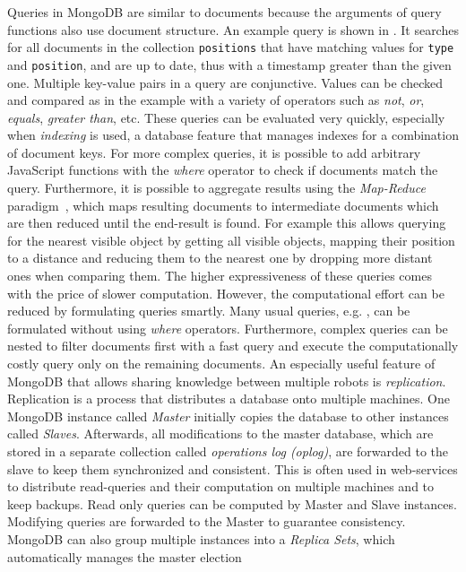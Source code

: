 Queries in MongoDB are similar to documents because the arguments of
query functions also use document structure. An example query is shown
in . It searches for all documents in the
collection \texttt{positions} that have matching values for
\texttt{type} and \texttt{position}, and are up to date, thus with a
timestamp greater than the given one. Multiple key-value pairs in a
query are conjunctive.  Values can be checked and compared as in the
example with a variety of operators such as \emph{not}, \emph{or},
\emph{equals}, \emph{greater than}, etc. These queries can be
evaluated very quickly, especially when \emph{indexing} is used, a
database feature that manages indexes for a combination of document
keys. For more complex queries, it is possible to add arbitrary
JavaScript functions with the \emph{where} operator to check if
documents match the query. Furthermore, it is possible to aggregate
results using the \emph{Map-Reduce} paradigm~\cite{mapreduce}, which
maps resulting documents to intermediate documents which are then
reduced until the end-result is found. For example this allows
querying for the nearest visible object by getting all visible
objects, mapping their position to a distance and reducing them to the
nearest one by dropping more distant ones when comparing them.  The
higher expressiveness of these queries comes with the price of slower
computation. However, the computational effort can be reduced by
formulating queries smartly. Many usual queries,
e.g. , can be formulated without using
\emph{where} operators. Furthermore, complex queries can be nested to
filter documents first with a fast query and execute the
computationally costly query only on the remaining documents.
%
An especially useful feature of MongoDB that allows sharing knowledge
between multiple robots is \emph{replication}. Replication is a
process that distributes a database onto multiple machines.  One
MongoDB instance called \emph{Master} initially copies the database to
other instances called \emph{Slaves}.  Afterwards, all modifications
to the master database, which are stored in a separate collection
called \emph{operations log (oplog)}, are forwarded to the slave to
keep them synchronized and consistent.
This is often used
in web-services to distribute read-queries and their computation on
multiple machines and to keep backups.
Read only queries can be computed by Master and Slave
instances. Modifying queries are forwarded to the Master to guarantee
consistency.  MongoDB can also group multiple instances into a
\emph{Replica Sets}, which automatically manages the master election
